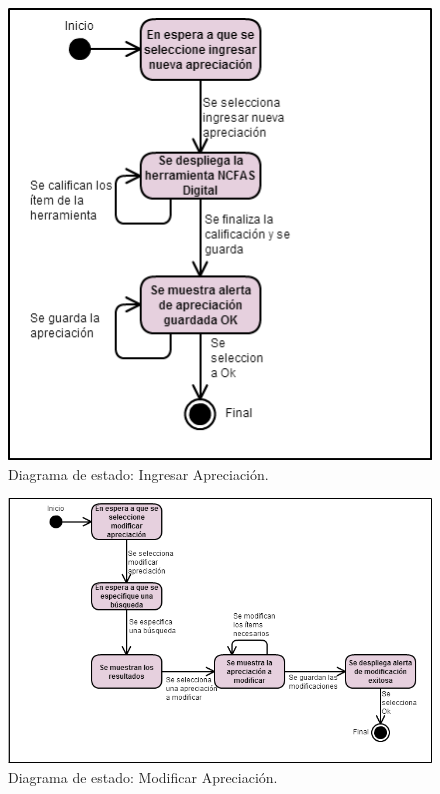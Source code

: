 \begin{figure}[htb]
	\label{dde4}
	\begin{center}
		\includegraphics[scale=0.5]{imagenes/IngresarNCFAS2.png}
	\end{center}
	\caption{Diagrama de estado: Ingresar Apreciación.}
\end{figure}


\begin{figure}[htb]
	\label{dde5}
	\begin{center}
		\includegraphics[scale=0.5]{imagenes/ModificarNCFAS2.png}
	\end{center}
	\caption{Diagrama de estado: Modificar Apreciación.}
\end{figure}

